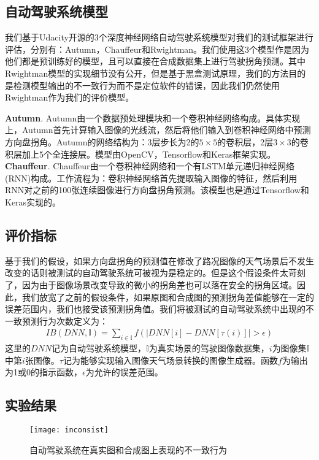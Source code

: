 \subsection{自动驾驶系统模型}

我们基于Udacity开源的3个深度神经网络自动驾驶系统模型对我们的测试框架进行评估，分别有：Autumn\cite{autumn}，Chauffeur\cite{Chauffeur}和Rwightman\cite{Rwightman}。我们使用这3个模型作是因为他们都是预训练好的模型，且可以直接在合成数据集上进行驾驶拐角预测。其中Rwightman模型的实现细节没有公开，但是基于黑盒测试原理，我们的方法目的是检测模型输出的不一致行为而不是定位软件的错误，因此我们仍然使用Rwightman作为我们的评价模型。

\textbf{Autumn}. Autumn由一个数据预处理模块和一个卷积神经网络构成。具体实现上，Autumn首先计算输入图像的光线流，然后将他们输入到卷积神经网络中预测方向盘拐角。Autumn的网络结构为：3层步长为2的$5\times 5$的卷积层，2层$3\times 3$的卷积层加上5个全连接层。模型由OpenCV，Tensorflow和Keras框架实现。
\textbf{Chauffeur}. Chauffeur由一个卷积神经网络和一个有LSTM单元递归神经网络(RNN)构成。工作流程为：卷积神经网络首先提取输入图像的特征，然后利用RNN对之前的100张连续图像进行方向盘拐角预测。该模型也是通过Tensorflow和Keras实现的。

\subsection{评价指标}

基于我们的假设，如果方向盘拐角的预测值在修改了路况图像的天气场景后不发生改变的话则被测试的自动驾驶系统可被视为是稳定的。但是这个假设条件太苛刻了，因为由于图像场景改变导致的微小的拐角差也可以落在安全的拐角区域。因此，我们放宽了之前的假设条件，如果原图和合成图的预测拐角差值能够在一定的误差范围内，我们也接受该预测拐角值。我们将被测试的自动驾驶系统中出现的不一致预测行为次数定义为：
\begin{gather}
    IB(DNN,\mathbb{I})=\sum_{i\in \mathbb{I}}f(|DNN[i]-DNN[\tau(i)]|>\epsilon)
\end{gather}
这里的$DNN$记为自动驾驶系统模型，$\mathbb{I}$为真实场景的驾驶图像数据集，$i$为图像集$\mathbb{I}$中第$i$张图像。$\tau$记为能够实现输入图像天气场景转换的图像生成器。函数$f$为输出为1或0的指示函数，$\epsilon$为允许的误差范围。

\subsection{实验结果}

\begin{figure}[htb]
    \centering
    \texttt{[image: inconsist]}
    \caption{自动驾驶系统在真实图和合成图上表现的不一致行为}
    \label{inconsist}
\end{figure}

